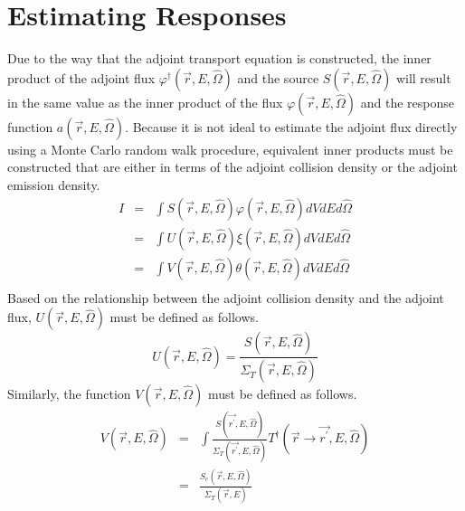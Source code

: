 \section{Estimating Responses}
Due to the way that the adjoint transport equation is constructed, the inner
product of the adjoint flux $\varphi^{\dagger}(\vec{r},E,\hat{\Omega})$ and the
source $S(\vec{r},E,\hat{\Omega})$ will result in the same value as the inner 
product of the flux $\varphi(\vec{r},E,\hat{\Omega})$ and the response
function $a(\vec{r},E,\hat{\Omega})$. Because it is not ideal to estimate the
adjoint flux directly using a Monte Carlo random walk procedure, equivalent
inner products must be constructed that are either in terms of the adjoint
collision density or the adjoint emission density.
\begin{eqnarray}
  I & = & \int S(\vec{r},E,\hat{\Omega})\varphi(\vec{r},E,\hat{\Omega})
  dV dE d\hat{\Omega} \\ 
  & = & \int U(\vec{r},E,\hat{\Omega})\xi(\vec{r},E,\hat{\Omega})
  dV dE d\hat{\Omega} \\
  & = & \int V(\vec{r},E,\hat{\Omega})\theta(\vec{r},E,\hat{\Omega})
  dV dE d\hat{\Omega} \\
\end{eqnarray}
Based on the relationship between the adjoint collision density and the
adjoint flux, $U(\vec{r},E,\hat{\Omega})$ must be defined as follows.
\begin{equation}
  U(\vec{r},E,\hat{\Omega}) = \frac{S(\vec{r},E,\hat{\Omega})}
                                   {\Sigma_T(\vec{r},E,\hat{\Omega})}
\end{equation}
Similarly, the function $V(\vec{r},E,\hat{\Omega})$ must be defined as follows.
\begin{eqnarray}
  V(\vec{r},E,\hat{\Omega}) & = & \int \frac{S(\vec{r^{'}},E,\hat{\Omega})}
  {\Sigma_T(\vec{r^{'}},E,\hat{\Omega})} 
  T^{\dagger}(\vec{r} \to \vec{r^{'}},E,\hat{\Omega}) \\
  & = & \frac{S_c(\vec{r},E,\hat{\Omega})}{\Sigma_T(\vec{r},E)}
\end{eqnarray}
